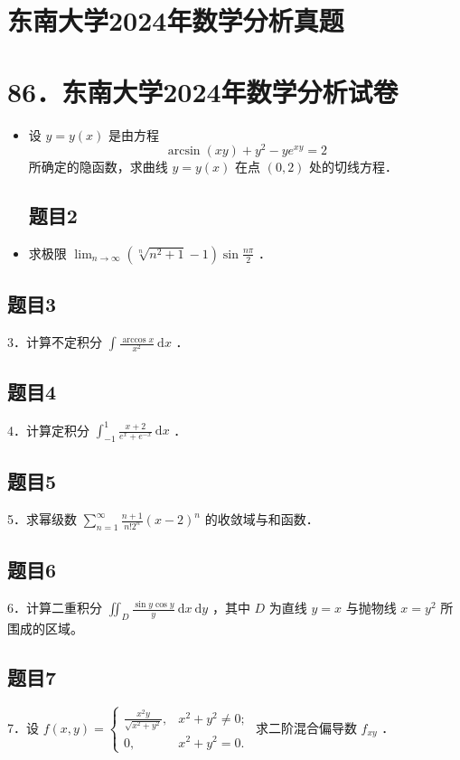 \documentclass{article}
\begin{document}
\section*{东南大学2024年数学分析真题}
\section*{86．东南大学2024年数学分析试卷}
\begin{itemize}

\subsection{题目1}
  \item[1．] 设 \(y=y(x)\) 是由方程
\[
\arcsin (x y)+y^{2}-y e^{x y}=2
\]
所确定的隐函数，求曲线 \(y=y(x)\) 在点 \((0,2)\) 处的切线方程．

\subsection{题目2}
  \item[2．] 求极限 \(\lim _{n \rightarrow \infty}\left(\sqrt[n]{n^{2}+1}-1\right) \sin \frac{n \pi}{2}\) ．
\end{itemize}

\subsection{题目3}
3．计算不定积分 \(\int \frac{\arccos x}{x^{2}} \mathrm{~d} x\) ．

\subsection{题目4}
4．计算定积分 \(\int_{-1}^{1} \frac{x+2}{e^{x}+e^{-x}} \mathrm{~d} x\) ．

\subsection{题目5}
5．求幂级数 \(\sum_{n=1}^{\infty} \frac{n+1}{n!2^{n}}(x-2)^{n}\) 的收敛域与和函数．

\subsection{题目6}
6．计算二重积分 \(\iint_{D} \frac{\sin y \cos y}{y} \mathrm{~d} x \mathrm{~d} y\) ，其中 \(D\) 为直线 \(y=x\) 与抛物线 \(x=y^{2}\) 所围成的区域。

\subsection{题目7}
7．设 \(f(x, y)=\left\{\begin{array}{ll}\frac{x^{2} y}{\sqrt{x^{2}+y^{2}}}, & x^{2}+y^{2} \neq 0 ; \\ 0, & x^{2}+y^{2}=0 .\end{array}\right.\) 求二阶混合偏导数 \(f_{x y}\) ．
\end{document}
